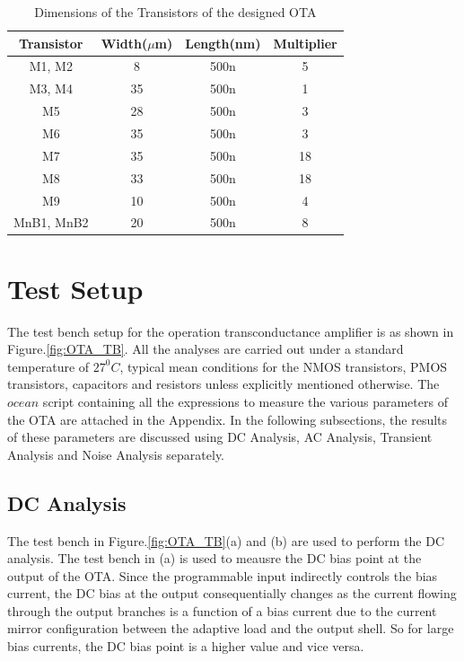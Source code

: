 \begin{table} [H]
\centering
\begin{tabular}{@{}cccc@{}}
\toprule
Transistor			& Width($\mu$m)		& Length(nm)		& Multiplier \\ \midrule
M1, M2				& 8					& 500n				& 5			\\
M3, M4				& 35				& 500n				& 1			\\
M5					& 28				& 500n				& 3			\\
M6					& 35				& 500n				& 3			\\
M7					& 35				& 500n				& 18		\\
M8					& 33				& 500n				& 18		\\
M9					& 10				& 500n				& 4			\\
MnB1, MnB2			& 20				& 500n				& 8			\\
\bottomrule
\end{tabular}
\caption{Dimensions of the Transistors of the designed OTA}
\label{tab:OTA_dimensions}
\end{table}

\section{Test Setup}
The test bench setup for the operation transconductance amplifier is as shown in Figure.\ref{fig:OTA_TB}. All the analyses are carried out under a standard temperature of $27^0C$, typical mean conditions for the NMOS transistors, PMOS transistors, capacitors and resistors unless explicitly mentioned otherwise. The $ocean$ script containing all the expressions to measure the various parameters of the OTA are attached in the Appendix. In the following subsections, the results of these parameters are discussed using DC Analysis, AC Analysis, Transient Analysis and Noise Analysis separately.

\subsection{DC Analysis}
The test bench in Figure.\ref{fig:OTA_TB}(a) and (b) are used to perform the DC analysis. The test bench in (a) is used to meausre the DC bias point at the output of the OTA. Since the programmable input indirectly controls the bias current, the DC bias at the output consequentially changes as the current flowing through the output branches is a function of a bias current due to the current mirror configuration between the adaptive load and the output shell. So for large bias currents, the DC bias point is a higher value and vice versa.
 

